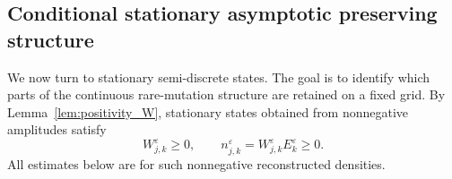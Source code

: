 \documentclass[11pt]{article}
\newtheorem{remark}{Remark}[section]
\begin{document}



\subsection{Conditional stationary asymptotic preserving structure}
\label{subsec:stationary_discrete_asymptotic preserving}

We now turn to stationary semi-discrete states. The goal is to identify which
parts of the continuous rare-mutation structure are retained on a fixed grid.
By Lemma~\ref{lem:positivity_W}, stationary states obtained from nonnegative
amplitudes satisfy
\[
    W_{j,k}^\varepsilon\ge0,
    \qquad
    n_{j,k}^\varepsilon
    =W_{j,k}^\varepsilon E_k^\varepsilon\ge0 .
\]
All estimates below are for such nonnegative reconstructed densities.
\end{document}
